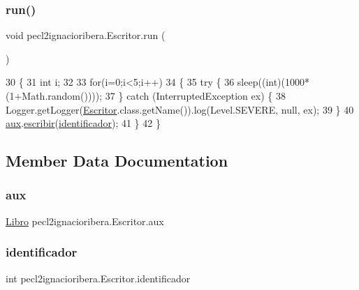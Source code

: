 \subsubsection{\texorpdfstring{run()}{run()}}
{\footnotesize\ttfamily void pecl2ignacioribera.\+Escritor.\+run (\begin{DoxyParamCaption}{ }\end{DoxyParamCaption})\hspace{0.3cm}{\ttfamily [inline]}}


\begin{DoxyCode}
30     \{
31         \textcolor{keywordtype}{int} i;
32         
33         \textcolor{keywordflow}{for}(i=0;i<5;i++)
34         \{
35             \textcolor{keywordflow}{try} \{
36                 sleep((\textcolor{keywordtype}{int})(1000*(1+Math.random())));
37             \} \textcolor{keywordflow}{catch} (InterruptedException ex) \{
38                 Logger.getLogger(\mbox{\hyperlink{classpecl2ignacioribera_1_1_escritor_a8ce7faa85a696b534b796fa339f8716b}{Escritor}}.class.getName()).log(Level.SEVERE, null, ex);
39             \}
40             \mbox{\hyperlink{classpecl2ignacioribera_1_1_escritor_ab1609b43aaa7b7fd72926798e8382b14}{aux}}.\mbox{\hyperlink{classpecl2ignacioribera_1_1_libro_a068f41dc0aac9a0755aacb19126110bf}{escribir}}(\mbox{\hyperlink{classpecl2ignacioribera_1_1_escritor_a99af112e84645111c4d03268058170ee}{identificador}});
41         \}
42     \}
\end{DoxyCode}


\subsection{Member Data Documentation}
\mbox{\label{classpecl2ignacioribera_1_1_escritor_ab1609b43aaa7b7fd72926798e8382b14}} 
\subsubsection{\texorpdfstring{aux}{aux}}
{\footnotesize\ttfamily \mbox{\hyperlink{classpecl2ignacioribera_1_1_libro}{Libro}} pecl2ignacioribera.\+Escritor.\+aux\hspace{0.3cm}{\ttfamily [package]}}

\mbox{\label{classpecl2ignacioribera_1_1_escritor_a99af112e84645111c4d03268058170ee}} 
\subsubsection{\texorpdfstring{identificador}{identificador}}
{\footnotesize\ttfamily int pecl2ignacioribera.\+Escritor.\+identificador\hspace{0.3cm}{\ttfamily [private]}}

